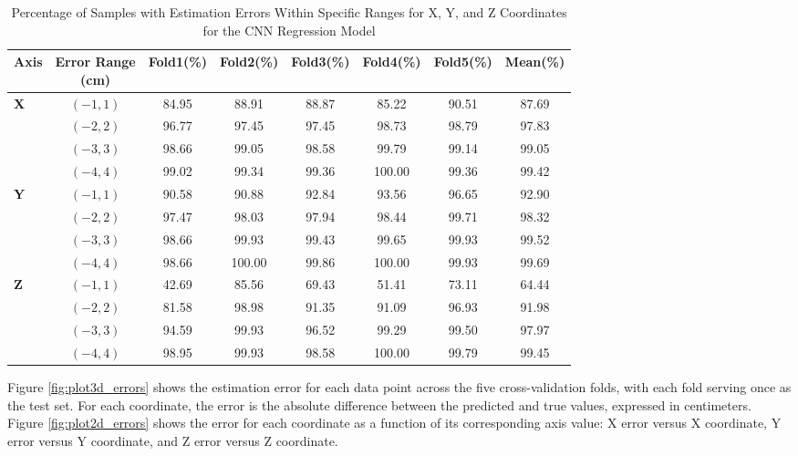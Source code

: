 \begin{table}[htbp]
  \centering
  \caption{Percentage of Samples with Estimation Errors Within Specific Ranges for X, Y, and Z Coordinates for the CNN Regression Model}
  \label{tab:error_distribution_xyz}
  \vspace{0.20cm}
  \footnotesize
  \begin{tabular}{lccccccc}
    \toprule
    \textbf{Axis} & \shortstack{\textbf{Error Range}\\\textbf{(cm)}} & \textbf{Fold1(\%)} & \textbf{Fold2(\%)} & \textbf{Fold3(\%)} & \textbf{Fold4(\%)} & \textbf{Fold5(\%)} & \textbf{Mean(\%)} \\
    \midrule
    \textbf{X} & $(-1, 1)$ & 84.95 & 88.91 & 88.87 & 85.22 & 90.51 & 87.69 \\
      & $(-2, 2)$ & 96.77 & 97.45 & 97.45 & 98.73 & 98.79 & 97.83 \\
      & $(-3, 3)$ & 98.66 & 99.05 & 98.58 & 99.79 & 99.14 & 99.05 \\
      & $(-4, 4)$ & 99.02 & 99.34 & 99.36 & 100.00 & 99.36 & 99.42 \\
    \midrule
    \textbf{Y} & $(-1, 1)$ & 90.58 & 90.88 & 92.84 & 93.56 & 96.65 & 92.90 \\
      & $(-2, 2)$ & 97.47 & 98.03 & 97.94 & 98.44 & 99.71 & 98.32 \\
      & $(-3, 3)$ & 98.66 & 99.93 & 99.43 & 99.65 & 99.93 & 99.52 \\
      & $(-4, 4)$ & 98.66 & 100.00 & 99.86 & 100.00 & 99.93 & 99.69 \\
    \midrule
    \textbf{Z} & $(-1, 1)$ & 42.69 & 85.56 & 69.43 & 51.41 & 73.11 & 64.44 \\
      & $(-2, 2)$ & 81.58 & 98.98 & 91.35 & 91.09 & 96.93 & 91.98 \\
      & $(-3, 3)$ & 94.59 & 99.93 & 96.52 & 99.29 & 99.50 & 97.97 \\
      & $(-4, 4)$ & 98.95 & 99.93 & 98.58 & 100.00 & 99.79 & 99.45 \\
    \bottomrule
  \end{tabular}
\end{table}


Figure \ref{fig:plot3d_errors} shows the estimation error for each data point across the five cross-validation folds, with each fold serving once as the test set. For each coordinate, the error is the absolute difference between the predicted and true values, expressed in centimeters. Figure \ref{fig:plot2d_errors} shows the error for each coordinate as a function of its corresponding axis value: X error versus X coordinate, Y error versus Y coordinate, and Z error versus Z coordinate.



